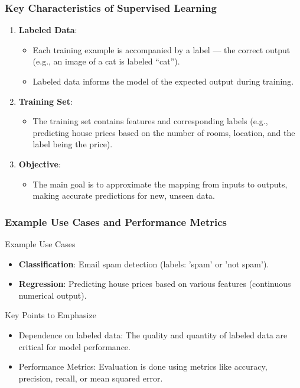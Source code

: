 \documentclass[aspectratio=169]{beamer}
\begin{document}
\begin{frame}[fragile]
    \frametitle{Key Characteristics of Supervised Learning}
    \begin{enumerate}
        \item \textbf{Labeled Data}:
            \begin{itemize}
                \item Each training example is accompanied by a label — the correct output (e.g., an image of a cat is labeled “cat”).
                \item Labeled data informs the model of the expected output during training.
            \end{itemize}
        
        \item \textbf{Training Set}:
            \begin{itemize}
                \item The training set contains features and corresponding labels (e.g., predicting house prices based on the number of rooms, location, and the label being the price).
            \end{itemize}
        
        \item \textbf{Objective}:
            \begin{itemize}
                \item The main goal is to approximate the mapping from inputs to outputs, making accurate predictions for new, unseen data.
            \end{itemize}
    \end{enumerate}
\end{frame}

\begin{frame}[fragile]
    \frametitle{Example Use Cases and Performance Metrics}
    \begin{block}{Example Use Cases}
        \begin{itemize}
            \item \textbf{Classification}: Email spam detection (labels: 'spam' or 'not spam').
            \item \textbf{Regression}: Predicting house prices based on various features (continuous numerical output).
        \end{itemize}
    \end{block}

    \begin{block}{Key Points to Emphasize}
        \begin{itemize}
            \item Dependence on labeled data: The quality and quantity of labeled data are critical for model performance.
            \item Performance Metrics: Evaluation is done using metrics like accuracy, precision, recall, or mean squared error.
        \end{itemize}
    \end{block}
\end{frame}
\end{document}
